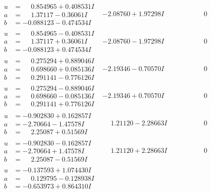 \documentclass[1p]{elsarticle_modified}
\theoremstyle{definition}
\begin{document}
$$\begin{array}{c|c|c}
\begin{aligned}
u &= \phantom{-}0.854965 + 0.408531 I \\
a &= \phantom{-}1.37117 - 0.36061 I \\
b &= -0.088123 - 0.474534 I\end{aligned}
 & -2.08760 + 1.97298 I & \phantom{-0.000000 } 0 \\ \hline\begin{aligned}
u &= \phantom{-}0.854965 - 0.408531 I \\
a &= \phantom{-}1.37117 + 0.36061 I \\
b &= -0.088123 + 0.474534 I\end{aligned}
 & -2.08760 - 1.97298 I & \phantom{-0.000000 } 0 \\ \hline\begin{aligned}
u &= \phantom{-}0.275294 + 0.889046 I \\
a &= \phantom{-}0.698660 + 0.085136 I \\
b &= \phantom{-}0.291141 - 0.776126 I\end{aligned}
 & -2.19346 - 0.70570 I & \phantom{-0.000000 } 0 \\ \hline\begin{aligned}
u &= \phantom{-}0.275294 - 0.889046 I \\
a &= \phantom{-}0.698660 - 0.085136 I \\
b &= \phantom{-}0.291141 + 0.776126 I\end{aligned}
 & -2.19346 + 0.70570 I & \phantom{-0.000000 } 0 \\ \hline\begin{aligned}
u &= -0.902830 + 0.162857 I \\
a &= -2.70664 - 1.47578 I \\
b &= \phantom{-}2.25087 + 0.51569 I\end{aligned}
 & \phantom{-}1.21120 - 2.28663 I & \phantom{-0.000000 } 0 \\ \hline\begin{aligned}
u &= -0.902830 - 0.162857 I \\
a &= -2.70664 + 1.47578 I \\
b &= \phantom{-}2.25087 - 0.51569 I\end{aligned}
 & \phantom{-}1.21120 + 2.28663 I & \phantom{-0.000000 } 0 \\ \hline\begin{aligned}
u &= -0.137593 + 1.074430 I \\
a &= \phantom{-}0.129795 - 0.128938 I \\
b &= -0.653973 + 0.864310 I\end{aligned}

\end{array}$$
\end{document}
